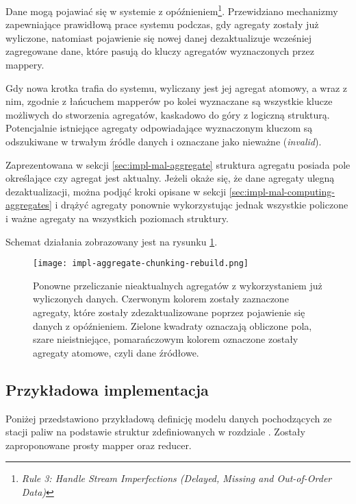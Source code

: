 Dane mogą pojawiać się w systemie z opóźnieniem\cite{stream-processing-streamsql}\footnote{\emph{Rule 3: Handle Stream Imperfections (Delayed, Missing and Out-of-Order Data)}}. Przewidziano mechanizmy zapewniające prawidłową prace systemu podczas, gdy agregaty zostały już wyliczone, natomiast pojawienie się nowej danej dezaktualizuje wcześniej zagregowane dane, które pasują do kluczy agregatów wyznaczonych przez mappery.

Gdy nowa krotka trafia do systemu, wyliczany jest jej agregat atomowy, a wraz z nim, zgodnie z łańcuchem mapperów po kolei wyznaczane są wszystkie klucze możliwych do stworzenia agregatów, kaskadowo do góry z logiczną strukturą. Potencjalnie istniejące agregaty odpowiadające wyznaczonym kluczom są odszukiwane w trwałym źródle danych i oznaczane jako nieważne (\emph{invalid}).

Zaprezentowana w sekcji \ref{sec:impl-mal-aggregate} struktura agregatu posiada pole określające czy agregat jest aktualny. Jeżeli okaże się, że dane agregaty ulegną dezaktualizacji, można podjąć kroki opisane w sekcji \ref{sec:impl-mal-computing-aggregates} i drążyć agregaty ponownie wykorzystując jednak wszystkie policzone i ważne agregaty na wszystkich poziomach struktury.

Schemat działania zobrazowany jest na rysunku \ref{fig:impl-aggregate-chunking-rebuild}.

\begin{figure}[h!]
\centering
\texttt{[image: impl-aggregate-chunking-rebuild.png]}
\caption{Ponowne przeliczanie nieaktualnych agregatów z wykorzystaniem już wyliczonych danych. Czerwonym kolorem zostały zaznaczone agregaty, które zostały zdezaktualizowane poprzez pojawienie się danych z opóźnieniem. Zielone kwadraty oznaczają obliczone pola, szare nieistniejące, pomarańczowym kolorem oznaczone zostały agregaty atomowe, czyli dane źródłowe.}
\label{fig:impl-aggregate-chunking-rebuild}
\end{figure}

\subsection{Przykładowa implementacja}

Poniżej przedstawiono przykładową definicję modelu danych pochodzących ze stacji paliw na podstawie struktur zdefiniowanych w rozdziale \label{sec:impl-mal-aggregate}. Zostały zaproponowane prosty mapper oraz reducer.




